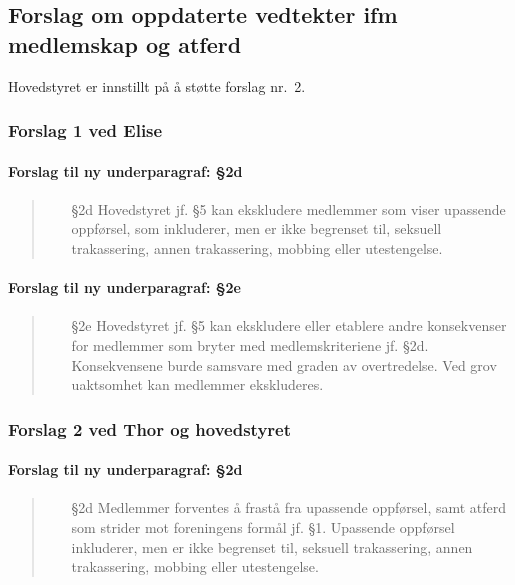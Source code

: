 \documentclass[10pt,norsk,a4paper]{article}
\begin{document}
\subsection{Forslag om oppdaterte vedtekter ifm medlemskap og atferd}

Hovedstyret er innstillt på å støtte forslag nr.\ 2.

\subsubsection{Forslag 1 ved Elise}
\paragraph{Forslag til ny underparagraf: §2d}
\begin{quote}
    \begin{enumerate}
        \item[§2d] Hovedstyret jf. §5 kan ekskludere medlemmer som viser upassende oppførsel, som inkluderer, men er ikke begrenset til, seksuell trakassering, annen trakassering, mobbing eller utestengelse.
    \end{enumerate}
\end{quote}

\paragraph{Forslag til ny underparagraf: §2e}
\begin{quote}
    \begin{enumerate}
        \item[§2e]
            Hovedstyret jf. §5 kan ekskludere eller etablere andre konsekvenser for medlemmer som bryter med medlemskriteriene jf. §2d.
            Konsekvensene burde samsvare med graden av overtredelse. Ved grov uaktsomhet kan medlemmer ekskluderes.
    \end{enumerate}
\end{quote}

\subsubsection{Forslag 2 ved Thor og hovedstyret}
\paragraph{Forslag til ny underparagraf: §2d}
\begin{quote}
    \begin{enumerate}
        \item[§2d]
            Medlemmer forventes å frastå fra upassende oppførsel, samt atferd som strider mot foreningens formål jf. §1.
            Upassende oppførsel inkluderer, men er ikke begrenset til, seksuell trakassering, annen trakassering, mobbing eller utestengelse.
    \end{enumerate}
\end{quote}
\end{document}

